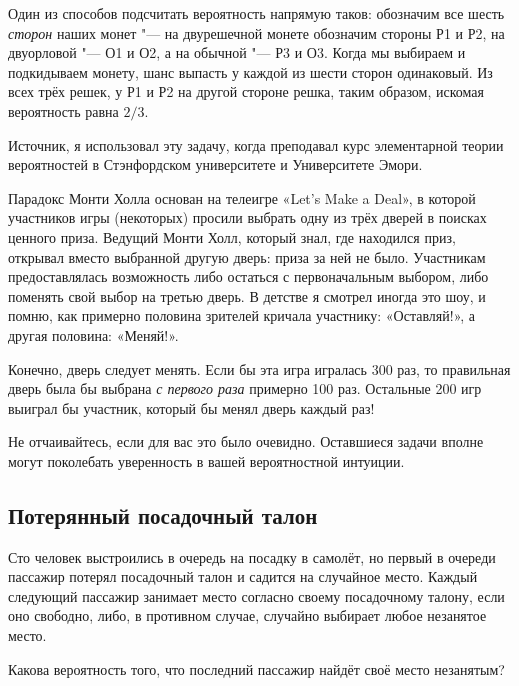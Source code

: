 \documentclass[twoside]{book}
\makeatletter
\newcommand{\rindex}[2][\imki@jobname]{%
  \index[#1]{\detokenize{#2}}%
}
\makeatother
\begin{document}
Один из способов подсчитать вероятность напрямую таков:
обозначим все шесть \emph{сторон} наших монет "---
на двурешечной монете обозначим стороны Р1 и Р2, на двуорловой "--- О1 и О2, а на обычной "--- Р3 и О3.
Когда мы выбираем и подкидываем монету, шанс выпасть у каждой из шести сторон одинаковый.
Из всех трёх решек, у Р1 и Р2 на другой стороне решка, таким образом, искомая вероятность равна $2/3$.\heart

\medskip
{\small 
Источник, я использовал эту задачу, когда преподавал курс элементарной теории вероятностей в Стэнфордском университете и Университете Эмори.

}
\medskip

Парадокс Монти Холла основан на телеигре «Let’s Make a Deal», в которой участников игры (некоторых) просили выбрать одну из трёх дверей в поисках ценного приза.
Ведущий Монти Холл, который знал, где находился приз, открывал вместо выбранной другую дверь: приза за ней не было.
Участникам предоставлялась возможность либо остаться с первоначальным выбором, либо поменять свой выбор на третью дверь.
В детстве я смотрел иногда это шоу, и помню, как примерно половина зрителей кричала участнику: «Оставляй!», а другая половина: «Меняй!».

Конечно, дверь следует менять.
Если бы эта игра игралась 300 раз, то правильная дверь была бы выбрана \emph{с первого раза} примерно 100 раз.
Остальные 200 игр выиграл бы участник, который бы менял дверь каждый раз!


Не отчаивайтесь, если для вас это было очевидно.
Оставшиеся задачи вполне могут поколебать уверенность в вашей вероятностной интуиции.

\subsection*{Потерянный посадочный талон}%
\rindex{Потерянный посадочный талон}

Сто человек выстроились в очередь на посадку в самолёт, но первый в очереди пассажир потерял посадочный талон и садится на случайное место.
Каждый следующий пассажир занимает место согласно своему посадочному талону, если оно свободно, либо, в противном случае, случайно выбирает любое незанятое место.

\medskip

Какова вероятность того, что последний пассажир найдёт своё место незанятым?
\end{document}

